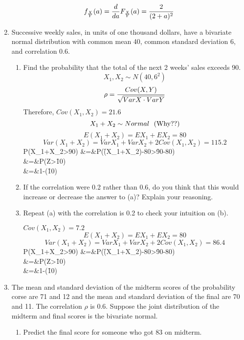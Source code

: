 \documentclass[12pt]{article}%
\newcommand{\0}{{\bf 0}}
\begin{document}
\begin{enumerate}
$$f_{\frac{X}{Y}}(a)=\frac{d}{da} F_{\frac{X}{Y}}(a)=\frac{2}{(2+a)^2}$$


\item
Successive weekly sales, in units of one thousand dollars, have a bivariate normal distribution with common mean 40, common standard deviation 6, and correlation 0.6.
\begin{enumerate}
\item Find the probability that the total of the next 2 weeks' sales exceeds 90.
\\
{\color{blue}{\bf Sol.}}
$$X_1,X_2 \sim N(40,6^2)$$
$$\rho=\frac{Cov(X,Y)}{\sqrt{VarX\cdot VarY}}$$
Therefore, $Cov(X_1,X_2)=21.6$
$$X_1+X_2 \sim Normal ~~ (\mbox{Why??})$$
$$E(X_1+X_2)=EX_1+EX_2=80$$
$$Var(X_1+X_2)=VarX_1+VarX_2+2Cov(X_1,X_2)=115.2$$ 
\bea
P(X_1+X_2>90)
&=&P(\f{(X_1+X_2)-80}{}>\f{90-80}{})\nn\\
&=&P(Z>\f{10}{}) \nn\\
&=&1-\Phi(\f{10}{})\nn
\eea

\item If the correlation were 0.2 rather than 0.6, do you think that this would increase or decrease the answer to (a)? Explain your reasoning.
\\
{\color{blue}{\bf Sol.}}


\item Repeat (a) with the correlation is 0.2 to check your intuition on (b).
\\
{\color{blue}{\bf Sol.}}

$Cov(X_1,X_2)=7.2$
$$E(X_1+X_2)=EX_1+EX_2=80$$
$$Var(X_1+X_2)=VarX_1+VarX_2+2Cov(X_1,X_2)=86.4$$ 
\bea
P(X_1+X_2>90)
&=&P(\f{(X_1+X_2)-80}{}>\f{90-80}{})\nn\\
&=&P(Z>\f{10}{}) \nn\\
&=&1-\Phi(\f{10}{})\nn
\eea

\end{enumerate}














\item
The mean and standard deviation of the midterm scores of the probability corse are 71 and 12
and
the mean and standard deviation of the final are 70 and 11.
The correlation $\rho$ is 0.6.
Suppose the joint distribution of the midterm and final scores is the bivariate normal.
\begin{enumerate}
\item Predict the final score for someone who got 83 on midterm.
\\
{\color{blue}{\bf Sol.}}




\end{enumerate}
\end{enumerate}
\end{document}
